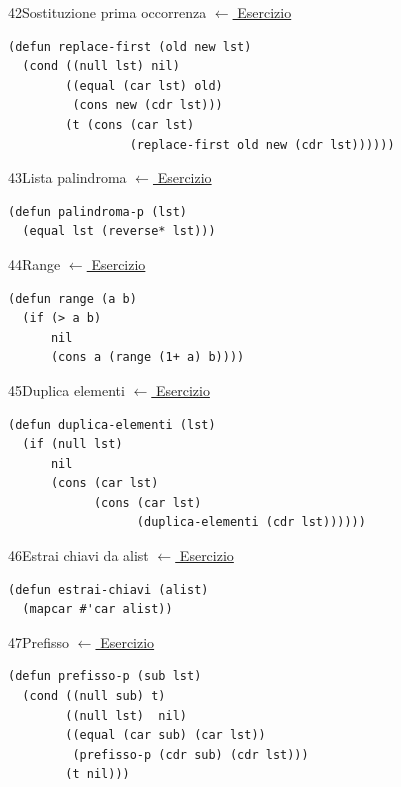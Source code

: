 \label{sol:42}
\begin{solbox}{42}{Sostituzione prima occorrenza}
\small\color{black!55}\hyperref[ex:42]{$\leftarrow$ Esercizio}\normalsize\color{black}
\begin{lstlisting}
(defun replace-first (old new lst)
  (cond ((null lst) nil)
        ((equal (car lst) old)
         (cons new (cdr lst)))
        (t (cons (car lst)
                 (replace-first old new (cdr lst))))))
\end{lstlisting}
\end{solbox}

\label{sol:43}
\begin{solbox}{43}{Lista palindroma}
\small\color{black!55}\hyperref[ex:43]{$\leftarrow$ Esercizio}\normalsize\color{black}
\begin{lstlisting}
(defun palindroma-p (lst)
  (equal lst (reverse* lst)))
\end{lstlisting}
\end{solbox}

\label{sol:44}
\begin{solbox}{44}{Range}
\small\color{black!55}\hyperref[ex:44]{$\leftarrow$ Esercizio}\normalsize\color{black}
\begin{lstlisting}
(defun range (a b)
  (if (> a b)
      nil
      (cons a (range (1+ a) b))))
\end{lstlisting}
\end{solbox}

\label{sol:45}
\begin{solbox}{45}{Duplica elementi}
\small\color{black!55}\hyperref[ex:45]{$\leftarrow$ Esercizio}\normalsize\color{black}
\begin{lstlisting}
(defun duplica-elementi (lst)
  (if (null lst)
      nil
      (cons (car lst)
            (cons (car lst)
                  (duplica-elementi (cdr lst))))))
\end{lstlisting}
\end{solbox}

\label{sol:46}
\begin{solbox}{46}{Estrai chiavi da alist}
\small\color{black!55}\hyperref[ex:46]{$\leftarrow$ Esercizio}\normalsize\color{black}
\begin{lstlisting}
(defun estrai-chiavi (alist)
  (mapcar #'car alist))
\end{lstlisting}
\end{solbox}

\label{sol:47}
\begin{solbox}{47}{Prefisso}
\small\color{black!55}\hyperref[ex:47]{$\leftarrow$ Esercizio}\normalsize\color{black}
\begin{lstlisting}
(defun prefisso-p (sub lst)
  (cond ((null sub) t)
        ((null lst)  nil)
        ((equal (car sub) (car lst))
         (prefisso-p (cdr sub) (cdr lst)))
        (t nil)))
\end{lstlisting}
\end{solbox}

